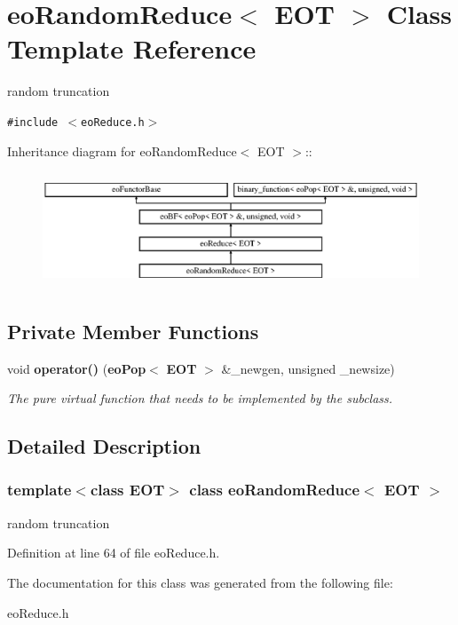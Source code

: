 \section{eo\-Random\-Reduce$<$ EOT $>$ Class Template Reference}
\label{classeo_random_reduce}
random truncation  


{\tt \#include $<$eo\-Reduce.h$>$}

Inheritance diagram for eo\-Random\-Reduce$<$ EOT $>$::\begin{figure}[H]
\begin{center}
\leavevmode
\includegraphics[height=3.45679cm]{classeo_random_reduce}
\end{center}
\end{figure}
\subsection*{Private Member Functions}
\begin{CompactItemize}
\item 
void {\bf operator()} ({\bf eo\-Pop}$<$ {\bf EOT} $>$ \&\_\-newgen, unsigned \_\-newsize)\label{classeo_random_reduce_d0}

\begin{CompactList}\small\item\em The pure virtual function that needs to be implemented by the subclass. \item\end{CompactList}\end{CompactItemize}


\subsection{Detailed Description}
\subsubsection*{template$<$class EOT$>$ class eo\-Random\-Reduce$<$ EOT $>$}

random truncation 



Definition at line 64 of file eo\-Reduce.h.

The documentation for this class was generated from the following file:\begin{CompactItemize}
\item 
eo\-Reduce.h\end{CompactItemize}
